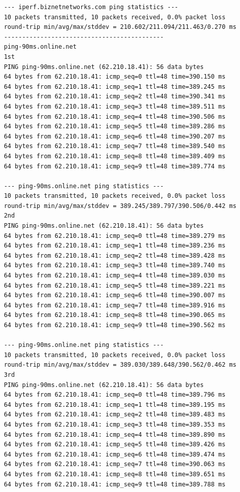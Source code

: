 \documentclass[paper=a4, fontsize=10pt]{scrartcl} %
\numberwithin{equation}{section} %
\numberwithin{figure}{section} %
\numberwithin{table}{section} %
\begin{document}
\begin{lstlisting}
    --- iperf.biznetnetworks.com ping statistics ---
    10 packets transmitted, 10 packets received, 0.0% packet loss
    round-trip min/avg/max/stddev = 210.602/211.094/211.463/0.270 ms
    --------------------------------------------
    ping-90ms.online.net
    1st
    PING ping-90ms.online.net (62.210.18.41): 56 data bytes
    64 bytes from 62.210.18.41: icmp_seq=0 ttl=48 time=390.150 ms
    64 bytes from 62.210.18.41: icmp_seq=1 ttl=48 time=389.245 ms
    64 bytes from 62.210.18.41: icmp_seq=2 ttl=48 time=390.341 ms
    64 bytes from 62.210.18.41: icmp_seq=3 ttl=48 time=389.511 ms
    64 bytes from 62.210.18.41: icmp_seq=4 ttl=48 time=390.506 ms
    64 bytes from 62.210.18.41: icmp_seq=5 ttl=48 time=389.286 ms
    64 bytes from 62.210.18.41: icmp_seq=6 ttl=48 time=390.207 ms
    64 bytes from 62.210.18.41: icmp_seq=7 ttl=48 time=389.540 ms
    64 bytes from 62.210.18.41: icmp_seq=8 ttl=48 time=389.409 ms
    64 bytes from 62.210.18.41: icmp_seq=9 ttl=48 time=389.774 ms
    
    --- ping-90ms.online.net ping statistics ---
    10 packets transmitted, 10 packets received, 0.0% packet loss
    round-trip min/avg/max/stddev = 389.245/389.797/390.506/0.442 ms
    2nd
    PING ping-90ms.online.net (62.210.18.41): 56 data bytes
    64 bytes from 62.210.18.41: icmp_seq=0 ttl=48 time=389.279 ms
    64 bytes from 62.210.18.41: icmp_seq=1 ttl=48 time=389.236 ms
    64 bytes from 62.210.18.41: icmp_seq=2 ttl=48 time=389.428 ms
    64 bytes from 62.210.18.41: icmp_seq=3 ttl=48 time=389.740 ms
    64 bytes from 62.210.18.41: icmp_seq=4 ttl=48 time=389.030 ms
    64 bytes from 62.210.18.41: icmp_seq=5 ttl=48 time=389.221 ms
    64 bytes from 62.210.18.41: icmp_seq=6 ttl=48 time=390.007 ms
    64 bytes from 62.210.18.41: icmp_seq=7 ttl=48 time=389.916 ms
    64 bytes from 62.210.18.41: icmp_seq=8 ttl=48 time=390.065 ms
    64 bytes from 62.210.18.41: icmp_seq=9 ttl=48 time=390.562 ms
    
    --- ping-90ms.online.net ping statistics ---
    10 packets transmitted, 10 packets received, 0.0% packet loss
    round-trip min/avg/max/stddev = 389.030/389.648/390.562/0.462 ms
    3rd
    PING ping-90ms.online.net (62.210.18.41): 56 data bytes
    64 bytes from 62.210.18.41: icmp_seq=0 ttl=48 time=389.796 ms
    64 bytes from 62.210.18.41: icmp_seq=1 ttl=48 time=389.195 ms
    64 bytes from 62.210.18.41: icmp_seq=2 ttl=48 time=389.483 ms
    64 bytes from 62.210.18.41: icmp_seq=3 ttl=48 time=389.353 ms
    64 bytes from 62.210.18.41: icmp_seq=4 ttl=48 time=389.890 ms
    64 bytes from 62.210.18.41: icmp_seq=5 ttl=48 time=389.426 ms
    64 bytes from 62.210.18.41: icmp_seq=6 ttl=48 time=389.474 ms
    64 bytes from 62.210.18.41: icmp_seq=7 ttl=48 time=390.063 ms
    64 bytes from 62.210.18.41: icmp_seq=8 ttl=48 time=389.651 ms
    64 bytes from 62.210.18.41: icmp_seq=9 ttl=48 time=389.788 ms
    

\end{lstlisting}
\end{document}
